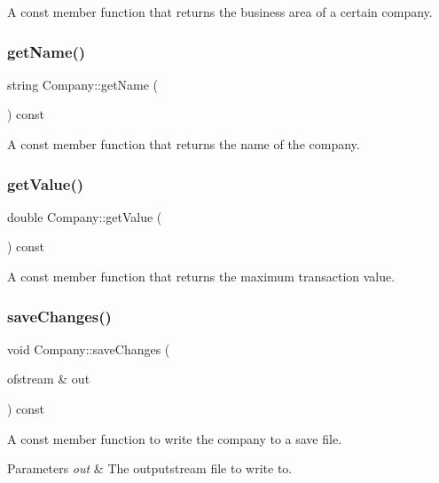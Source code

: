 A const member function that returns the business area of a certain company. \mbox{\label{class_company_a4a45565d61c119cb590383553bc327d1}} 
\subsubsection{\texorpdfstring{get\+Name()}{getName()}}
{\footnotesize\ttfamily string Company\+::get\+Name (\begin{DoxyParamCaption}{ }\end{DoxyParamCaption}) const}

A const member function that returns the name of the company. \mbox{\label{class_company_ac58564060524572039b49fe2ccda5f22}} 
\subsubsection{\texorpdfstring{get\+Value()}{getValue()}}
{\footnotesize\ttfamily double Company\+::get\+Value (\begin{DoxyParamCaption}{ }\end{DoxyParamCaption}) const}

A const member function that returns the maximum transaction value. \mbox{\label{class_company_a9ddf44ce09b2f41b03e7feb28153f376}} 
\subsubsection{\texorpdfstring{save\+Changes()}{saveChanges()}}
{\footnotesize\ttfamily void Company\+::save\+Changes (\begin{DoxyParamCaption}\item[{ofstream \&}]{out }\end{DoxyParamCaption}) const}

A const member function to write the company to a save file. 
\begin{DoxyParams}{Parameters}
{\em out} & The outputstream file to write to. \\
\hline
\end{DoxyParams}
\mbox{\label{class_company_ac3ac784557289240512046b43bac21e6}} 
